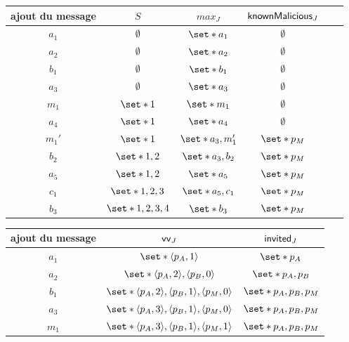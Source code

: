 \begin{table}[ht]
    \begin{subtable}{\linewidth}
    \centering
    \begin{tabular}{cccccc}
        ajout du message & $S$ & $max_J$ & $\operatorname{\mathsf{knownMalicious}}_J$ \\
        \toprule
        $a_1$ & $\emptyset$ & $\set*{a_1}$ & $\emptyset$ \\
        $a_2$ & $\emptyset$ & $\set*{a_2}$ & $\emptyset$ \\
        $b_1$ & $\emptyset$ & $\set*{b_1}$ & $\emptyset$ \\
        $a_3$ & $\emptyset$ & $\set*{a_3}$ & $\emptyset$ \\
        $m_1$ & $\set*{1}$ & $\set*{m_1}$ & $\emptyset$ \\
        $a_4$ & $\set*{1}$ & $\set*{a_4}$ & $\emptyset$ \\
        $m_1'$ & $\set*{1}$ & $\set*{a_3,m_1'}$ & $\set*{p_M}$ \\
        $b_2$ & $\set*{1,2}$ & $\set*{a_3,b_2}$ & $\set*{p_M}$ \\
        $a_5$ & $\set*{1,2}$ & $\set*{a_5}$ & $\set*{p_M}$ \\
        $c_1$ & $\set*{1,2,3}$ & $\set*{a_5,c_1}$ & $\set*{p_M}$ \\
        $b_3$ & $\set*{1,2,3,4}$ & $\set*{b_3}$ & $\set*{p_M}$ \\
    \end{tabular}
    \end{subtable}
    \par\smallskip
    \begin{subtable}{\linewidth}
    \centering
    \begin{tabular}{ccc}
        ajout du message & $\operatorname{\mathsf{vv}}_J$ & $\operatorname{\mathsf{invited}}_J$ \\
        \toprule
        $a_1$ & $\set*{\tuple*{p_A, 1}}$ & $\set*{p_A}$ \\
        $a_2$ & $\set*{\tuple*{p_A, 2}, \tuple*{p_B, 0}}$ & $\set*{p_A,p_B}$ \\
        $b_1$ & $\set*{\tuple*{p_A, 2}, \tuple*{p_B, 1}, \tuple*{p_M, 0}}$ & $\set*{p_A,p_B,p_M}$ \\
        $a_3$ & $\set*{\tuple*{p_A, 3}, \tuple*{p_B, 1}, \tuple*{p_M, 0}}$ & $\set*{p_A,p_B,p_M}$ \\
        $m_1$ & $\set*{\tuple*{p_A, 3}, \tuple*{p_B, 1}, \tuple*{p_M, 1}}$ & $\set*{p_A,p_B,p_M}$ \\

\end{tabular}
\end{subtable}
\end{table}
